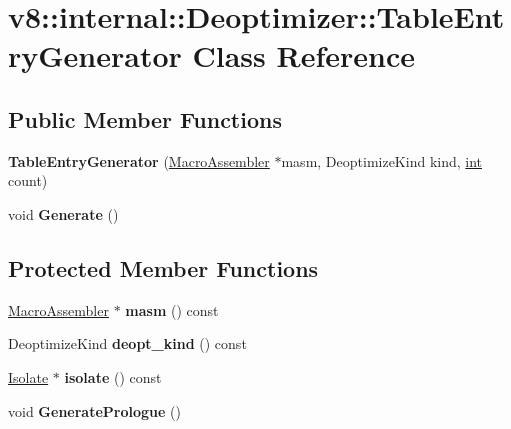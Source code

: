 \hypertarget{classv8_1_1internal_1_1Deoptimizer_1_1TableEntryGenerator}{}\section{v8\+:\+:internal\+:\+:Deoptimizer\+:\+:Table\+Entry\+Generator Class Reference}
\label{classv8_1_1internal_1_1Deoptimizer_1_1TableEntryGenerator}
\subsection*{Public Member Functions}
\begin{DoxyCompactItemize}
\item 
\mbox{\label{classv8_1_1internal_1_1Deoptimizer_1_1TableEntryGenerator_abbcb8c90d4f92f000a1d5e7c82f498d0}} 
{\bfseries Table\+Entry\+Generator} (\mbox{\hyperlink{classv8_1_1internal_1_1MacroAssembler}{Macro\+Assembler}} $\ast$masm, Deoptimize\+Kind kind, \mbox{\hyperlink{classint}{int}} count)
\item 
\mbox{\label{classv8_1_1internal_1_1Deoptimizer_1_1TableEntryGenerator_a9b88c4f52c7c18ed0742f68bd669401c}} 
void {\bfseries Generate} ()
\end{DoxyCompactItemize}
\subsection*{Protected Member Functions}
\begin{DoxyCompactItemize}
\item 
\mbox{\label{classv8_1_1internal_1_1Deoptimizer_1_1TableEntryGenerator_a503b21a41a4d89f009888a988c288465}} 
\mbox{\hyperlink{classv8_1_1internal_1_1MacroAssembler}{Macro\+Assembler}} $\ast$ {\bfseries masm} () const
\item 
\mbox{\label{classv8_1_1internal_1_1Deoptimizer_1_1TableEntryGenerator_ac96d671e19580bd1d064b4ae9bc05857}} 
Deoptimize\+Kind {\bfseries deopt\+\_\+kind} () const
\item 
\mbox{\label{classv8_1_1internal_1_1Deoptimizer_1_1TableEntryGenerator_a7132c3f950b99ed110c38d9dfe91aa90}} 
\mbox{\hyperlink{classv8_1_1internal_1_1Isolate}{Isolate}} $\ast$ {\bfseries isolate} () const
\item 
\mbox{\label{classv8_1_1internal_1_1Deoptimizer_1_1TableEntryGenerator_a7bc43f4dce5b2828dcac332f193a8c5c}} 
void {\bfseries Generate\+Prologue} ()
\end{DoxyCompactItemize}


